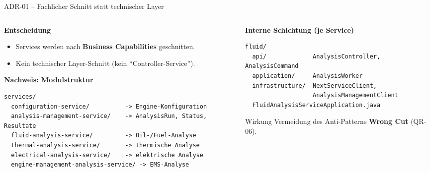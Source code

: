 
\begin{frame}[fragile]{ADR-01 -- Fachlicher Schnitt statt technischer Layer}
  \begin{columns}[T,onlytextwidth]
    \begin{column}{0.5\textwidth}
      \textbf{Entscheidung}
      \begin{itemize}
        \item Services werden nach \textbf{Business Capabilities} geschnitten.
        \item Kein technischer Layer-Schnitt (kein ``Controller-Service'').
      \end{itemize}

      \vspace{0.25cm}
      \textbf{Nachweis: Modulstruktur}
      \begin{lstlisting}[style=bash]
services/
  configuration-service/          -> Engine-Konfiguration
  analysis-management-service/    -> AnalysisRun, Status, Resultate
  fluid-analysis-service/         -> Oil-/Fuel-Analyse
  thermal-analysis-service/       -> thermische Analyse
  electrical-analysis-service/    -> elektrische Analyse
  engine-management-analysis-service/ -> EMS-Analyse
      \end{lstlisting}
    \end{column}
    \begin{column}{0.46\textwidth}
      \textbf{Interne Schichtung (je Service)}
      \begin{lstlisting}[style=bash]
fluid/
  api/             AnalysisController, AnalysisCommand
  application/     AnalysisWorker
  infrastructure/  NextServiceClient,
                   AnalysisManagementClient
  FluidAnalysisServiceApplication.java
      \end{lstlisting}

      \vspace{0.2cm}
      \begin{block}{Wirkung}
        \small Vermeidung des Anti-Patterns \textbf{Wrong Cut} (QR-06).
      \end{block}
    \end{column}
  \end{columns}
\end{frame}

